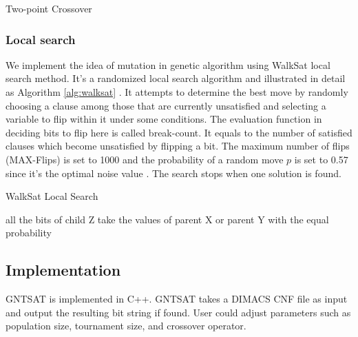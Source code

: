 	\begin{algorithm}
				\SetAlgoLined
				\caption{Two-point Crossover}
				\label{alg:twopoint} 
				\BlankLine
			  \end{algorithm}
	
	\subsubsection{Local search}
	We implement the idea of mutation in genetic algorithm using WalkSat local search method.
	It's a randomized local search algorithm and illustrated in detail as Algorithm \ref{alg:walksat} \parencite{biere2009handbook}. It attempts to determine the best move by randomly choosing a clause among those that are currently unsatisfied and selecting a variable to flip within it under some conditions. The evaluation function in deciding bits to flip here is called break-count. It equals to the number of satisfied clauses which become unsatisfied by flipping a bit. The maximum number of flips (MAX-Flips) is set to 1000 and the probability of a random move $p$ is set to 0.57 since it's the optimal noise value \parencite{SAO05}. The search stops when one solution is found.
	
	\begin{algorithm*}
	  \SetAlgoLined
	  \caption{WalkSat Local Search}
	  \label{alg:walksat} 
	  \BlankLine
	    all the bits of child Z take the values of parent X or parent Y with the equal probability\;
	\end{algorithm*}
	\subsection{Implementation}
	GNTSAT is implemented in C++. GNTSAT takes a DIMACS CNF file as input and
	output the resulting bit string if found. User could adjust parameters such as
	population size, tournament size, and crossover operator.
	
